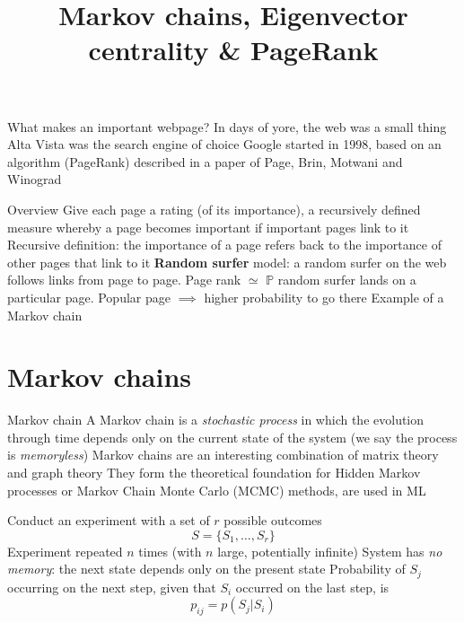 \documentclass[aspectratio=169]{beamer}
\title{Markov chains, Eigenvector centrality \& PageRank}
\date{}
\begin{document}
\begin{frame}
	\titlepage
\end{frame}


\begin{frame}{What makes an important webpage?}
	In days of yore, the web was a small thing
	\vfill
	Alta Vista was the search engine of choice
	\vfill
	Google started in 1998, based on an algorithm (PageRank) described in a paper of Page, Brin, Motwani and Winograd
\end{frame}

\begin{frame}{Overview}
	Give each page a rating (of its importance), a recursively defined measure whereby a page becomes important if important pages link to it
	\vfill
	Recursive definition: the importance of a page refers back to the importance of other pages that link to it
	\vfill
	\textbf{Random surfer} model: a random surfer on the web follows links from page to page. Page rank $\simeq$ $\mathbb{P}$ random surfer lands on a particular page. Popular page $\implies$ higher probability to go there
	\vfill Example of a Markov chain
\end{frame}

\section{Markov chains}
\begin{frame}{Markov chain}
	A Markov chain is a \emph{stochastic process} in which the evolution through time depends only on the current state of the system (we say the process is \emph{memoryless})
	\vfill
	Markov chains are an interesting combination of matrix theory and graph theory
	\vfill
	They form the theoretical foundation for Hidden Markov processes or Markov Chain Monte Carlo (MCMC) methods, are used in ML
\end{frame}



\begin{frame}
Conduct an experiment with a set of $r$ possible outcomes
\[
S=\{S_1,\dots, S_r\}
\]
\vfill
Experiment repeated $n$ times (with $n$ large, potentially infinite)
\vfill 
System has \emph{no memory}: the next state depends only on the present state
\vfill
Probability of $S_j$ occurring on the next step, given that $S_i$ occurred on the last step, is
\[
p_{ij}=p(S_j|S_i)
\]
\end{frame}
\end{document}
